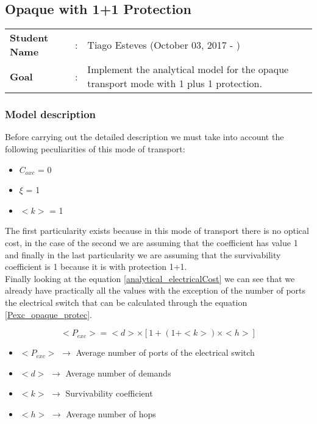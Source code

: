 \clearpage

\subsection{Opaque with 1+1 Protection}\label{analytical_Opaque_Protection}
\begin{tcolorbox}	
\begin{tabular}{p{2.75cm} p{0.2cm} p{10.5cm}} 	
\textbf{Student Name}  &:& Tiago Esteves    (October 03, 2017 - )\\
\textbf{Goal}          &:& Implement the analytical model for the opaque transport mode with 1 plus 1 protection.
\end{tabular}
\end{tcolorbox}

\subsubsection{Model description}

Before carrying out the detailed description we must take into account the following peculiarities of this mode of transport:
\begin{itemize}
  \item $C_{oxc}$ = 0
  \item $\xi$ = 1
  \item $<k>$ = 1
\end{itemize}

\vspace{11pt}
The first particularity exists because in this mode of transport there is no optical cost, in the case of the second we are assuming that the coefficient has value 1 and finally in the last particularity we are assuming that the survivability coefficient is 1 because it is with protection 1+1.\\

Finally looking at the equation \ref{analytical_electricalCost} we can see that we already have practically all the values with the exception of the number of ports the electrical switch that can be calculated through the equation \ref{Pexc_opaque_protec}.

\begin{equation}
<P_{exc}> = <d> \times [1 + \left(1 + <k>\right) \times <h>]
\label{Pexc_opaque_protec}
\end{equation}

\begin{itemize}
\item{$<P_{exc}>$ $\rightarrow$ Average number of ports of the electrical switch}
\item{$<d>$		  $\rightarrow$ Average number of demands}
\item{$<k>$		  $\rightarrow$ Survivability coefficient}	
\item{$<h>$	      $\rightarrow$ Average number of hops}
\end{itemize}

